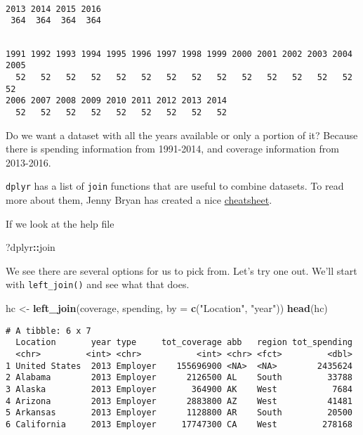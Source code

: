 \documentclass[]{article}
\newenvironment{Shaded}{\begin{snugshade}}{\end{snugshade}}
\newcommand{\DataTypeTok}[1]{\textcolor[rgb]{0.13,0.29,0.53}{#1}}
\newcommand{\KeywordTok}[1]{\textcolor[rgb]{0.13,0.29,0.53}{\textbf{#1}}}
\newcommand{\NormalTok}[1]{#1}
\newcommand{\OperatorTok}[1]{\textcolor[rgb]{0.81,0.36,0.00}{\textbf{#1}}}
\newcommand{\StringTok}[1]{\textcolor[rgb]{0.31,0.60,0.02}{#1}}
\begin{document}
\begin{verbatim}

2013 2014 2015 2016 
 364  364  364  364 
\end{verbatim}

\begin{Shaded}
\end{Shaded}

\begin{verbatim}

1991 1992 1993 1994 1995 1996 1997 1998 1999 2000 2001 2002 2003 2004 2005 
  52   52   52   52   52   52   52   52   52   52   52   52   52   52   52 
2006 2007 2008 2009 2010 2011 2012 2013 2014 
  52   52   52   52   52   52   52   52   52 
\end{verbatim}

Do we want a dataset with all the years available or only a portion of
it? Because there is spending information from 1991-2014, and coverage
information from 2013-2016.

\texttt{dplyr} has a list of \texttt{join} functions that are useful to
combine datasets. To read more about them, Jenny Bryan has created a
nice \href{http://stat545.com/bit001_dplyr-cheatsheet.html}{cheatsheet}.

If we look at the help file

\begin{Shaded}
\begin{Highlighting}[]
\NormalTok{?dplyr}\OperatorTok{::}\NormalTok{join}
\end{Highlighting}
\end{Shaded}

We see there are several options for us to pick from. Let's try one out.
We'll start with \texttt{left\_join()} and see what that does.

\begin{Shaded}
\begin{Highlighting}[]
\NormalTok{hc <-}\StringTok{ }\KeywordTok{left_join}\NormalTok{(coverage, spending, }\DataTypeTok{by =} \KeywordTok{c}\NormalTok{(}\StringTok{"Location"}\NormalTok{, }\StringTok{"year"}\NormalTok{))}
\KeywordTok{head}\NormalTok{(hc)}
\end{Highlighting}
\end{Shaded}

\begin{verbatim}
# A tibble: 6 x 7
  Location       year type     tot_coverage abb   region tot_spending
  <chr>         <int> <chr>           <int> <chr> <fct>         <dbl>
1 United States  2013 Employer    155696900 <NA>  <NA>        2435624
2 Alabama        2013 Employer      2126500 AL    South         33788
3 Alaska         2013 Employer       364900 AK    West           7684
4 Arizona        2013 Employer      2883800 AZ    West          41481
5 Arkansas       2013 Employer      1128800 AR    South         20500
6 California     2013 Employer     17747300 CA    West         278168
\end{verbatim}
\end{document}
